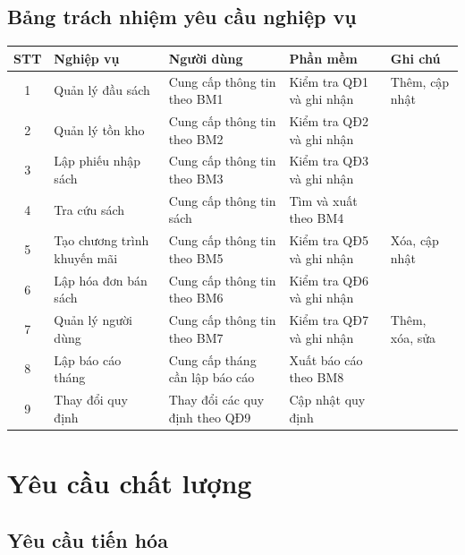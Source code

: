 \documentclass[12pt]{report}
\begin{document}
        \subsection{Bảng trách nhiệm yêu cầu nghiệp vụ}
            \begin{tabularx}{\textwidth}{|c|>{\RaggedRight}X|>{\RaggedRight}X|>{\RaggedRight}X|l|}
                \hline
                \textbf{STT} & \textbf{Nghiệp vụ} & 
                \textbf{Người dùng} & \textbf{Phần mềm} & 
                \textbf{Ghi chú} \\ \hline

                1 & Quản lý đầu sách & Cung cấp thông tin theo BM1 & Kiểm tra QĐ1 và ghi nhận & Thêm, cập nhật \\ \hline
                2 & Quản lý tồn kho & Cung cấp thông tin theo BM2 & Kiểm tra QĐ2 và ghi nhận & \\ \hline
                3 & Lập phiếu nhập sách & Cung cấp thông tin theo BM3 & Kiểm tra QĐ3 và ghi nhận & \\ \hline
                4 & Tra cứu sách & Cung cấp thông tin sách & Tìm và xuất theo BM4 & \\ \hline
                5 & Tạo chương trình khuyến mãi & Cung cấp thông tin theo BM5 & Kiểm tra QĐ5 và ghi nhận & Xóa, cập nhật \\ \hline
                6 & Lập hóa đơn bán sách & Cung cấp thông tin theo BM6 & Kiểm tra QĐ6 và ghi nhận & \\ \hline
                7 & Quản lý người dùng & Cung cấp thông tin theo BM7 & Kiểm tra QĐ7 và ghi nhận & Thêm, xóa, sửa \\ \hline
                8 & Lập báo cáo tháng & Cung cấp tháng cần lập báo cáo & Xuất báo cáo theo BM8 & \\ \hline
                9 & Thay đổi quy định & Thay đổi các quy định theo QĐ9 & Cập nhật quy định & \\ \hline
            \end{tabularx}
    \section{Yêu cầu chất lượng}
        \subsection{Yêu cầu tiến hóa}
\end{document}
